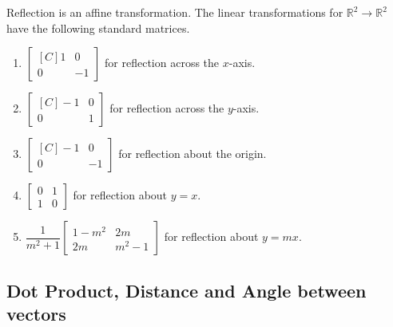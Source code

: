 \begin{proposition}
Reflection is an affine transformation. The linear transformations for $\mathbb{R}^2 \to \mathbb{R}^2$ have the following standard matrices.
\begin{enumerate}
\item $\begin{bmatrix*}[C] 1 & 0 \\ 0 & -1 \end{bmatrix*}$ for reflection across the $x$-axis.
\item $\begin{bmatrix*}[C] -1 & 0 \\ 0 & 1 \end{bmatrix*}$ for reflection across the $y$-axis.
\item $\begin{bmatrix*}[C] -1 & 0 \\ 0 & -1 \end{bmatrix*}$ for reflection about the origin.
\item $\begin{bmatrix} 0 & 1 \\ 1 & 0 \end{bmatrix}$ for reflection about $y=x$.
\item $\dfrac{1}{m^2+1}\begin{bmatrix} 1-m^2 & 2m \\ 2m & m^2-1 \end{bmatrix}$ for reflection about $y=mx$.
\end{enumerate}
\end{proposition}



\subsection{Dot Product, Distance and Angle between vectors}


